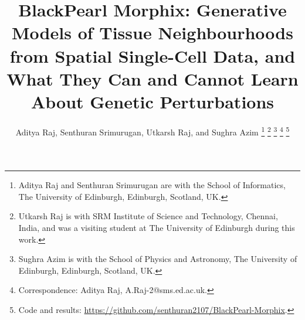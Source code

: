 \documentclass[journal]{IEEEtran}
\begin{document}
\title{BlackPearl Morphix: Generative Models of Tissue Neighbourhoods from Spatial Single-Cell Data, and What They Can and Cannot Learn About Genetic Perturbations}

\author{Aditya Raj, Senthuran Srimurugan, Utkarsh Raj, and Sughra Azim%
\thanks{Aditya Raj and Senthuran Srimurugan are with the School of Informatics, The University of Edinburgh, Edinburgh, Scotland, UK.}%
\thanks{Utkarsh Raj is with SRM Institute of Science and Technology, Chennai, India, and was a visiting student at The University of Edinburgh during this work.}%
\thanks{Sughra Azim is with the School of Physics and Astronomy, The University of Edinburgh, Edinburgh, Scotland, UK.}%
\thanks{Correspondence: Aditya Raj, A.Raj-2@sms.ed.ac.uk.}%
\thanks{Code and results: \url{https://github.com/senthuran2107/BlackPearl-Morphix}.}}

\maketitle
\end{document}

